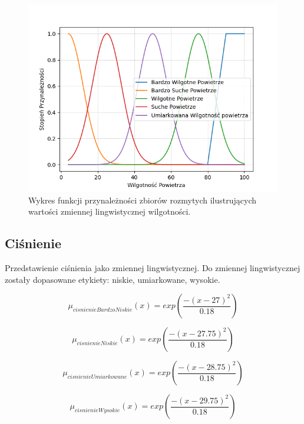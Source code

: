 \documentclass{classrep}
\begin{document}
\begin{figure}[h!]
 \centering
 \includegraphics[width=14cm]{FunkcjaPrzynaleznosciWilgotnosc.png}
 \vspace{-0.3cm}
 \caption{Wykres funkcji przynależności zbiorów rozmytych ilustrujących wartości zmiennej lingwistycznej wilgotności. }
 \label{rysunek do eksperymentu 1 wariantu 1}
\end{figure}
\newpage


\subsection{Ciśnienie}
Przedstawienie ciśnienia jako zmiennej lingwistycznej. Do zmiennej lingwistycznej zostały dopasowane etykiety: niskie, umiarkowane, wysokie. 

\begin{equation}
\mu _{cisnienieBardzoNiskie}(x) =   exp( \frac{- (x - 27)^2}{0.18} )
\end{equation}

\begin{equation}
\mu _{cisnienieNiskie}(x) =   exp( \frac{- (x - 27.75)^2}{0.18} )
\end{equation}

\begin{equation}
\mu _{cisnienieUmiarkowane}(x) =   exp( \frac{- (x - 28.75)^2}{0.18} )
\end{equation}

\begin{equation}
\mu _{cisnienieWysokie}(x) =   exp( \frac{- (x - 29.75)^2}{0.18} )
\end{equation}
\end{document}
